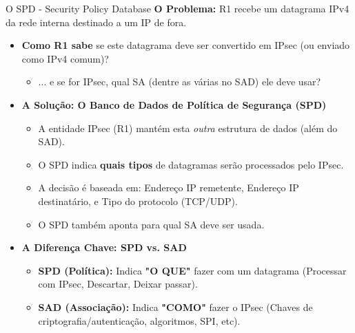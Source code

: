 \begin{frame}{O SPD - Security Policy Database}
    \textbf{O Problema:} R1 recebe um datagrama IPv4 da rede interna destinado a um IP de fora.
    \begin{itemize}

        \item \textbf{Como R1 sabe }se este datagrama deve ser convertido em IPsec (ou enviado como IPv4 comum)?
              \begin{itemize}
                  \item ... e se for IPsec, qual SA (dentre as várias no SAD) ele deve usar?
              \end{itemize}
    \end{itemize}

    \begin{itemize}



        \item \textbf{A Solução: O Banco de Dados de Política de Segurança (SPD)}
              \begin{itemize}

                  \item A entidade IPsec (R1) mantém esta \textit{outra} estrutura de dados (além do SAD).
                  \item O SPD indica \textbf{quais tipos} de datagramas serão processados pelo IPsec.
                  \item A decisão é baseada em: Endereço IP remetente, Endereço IP destinatário, e Tipo do protocolo (TCP/UDP).
                  \item O SPD também aponta para qual SA deve ser usada.
              \end{itemize}

        \item \textbf{A Diferença Chave: SPD vs. SAD}
              \begin{itemize}
                  \item \textbf{SPD (Política):} Indica \textbf{"O QUE"} fazer com um datagrama (Processar com IPsec, Descartar, Deixar passar).
                  \item \textbf{SAD (Associação):} Indica \textbf{"COMO"} fazer o IPsec (Chaves de criptografia/autenticação, algoritmos, SPI, etc).
              \end{itemize}
    \end{itemize}
\end{frame}

